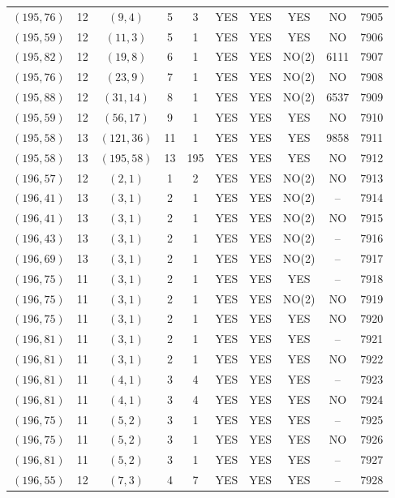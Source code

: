 \begin{longtable}{|c|c|c|c|c|c|c|c|c|c|}
$(195, 76)$ & 12 & $(9, 4)$ & 5 & 3 & YES & YES & YES & NO & 7905\\
$(195, 59)$ & 12 & $(11, 3)$ & 5 & 1 & YES & YES & YES & NO & 7906\\
$(195, 82)$ & 12 & $(19, 8)$ & 6 & 1 & YES & YES & NO(2) & 6111 & 7907\\
$(195, 76)$ & 12 & $(23, 9)$ & 7 & 1 & YES & YES & NO(2) & NO & 7908\\
$(195, 88)$ & 12 & $(31, 14)$ & 8 & 1 & YES & YES & NO(2) & 6537 & 7909\\
$(195, 59)$ & 12 & $(56, 17)$ & 9 & 1 & YES & YES & YES & NO & 7910\\
$(195, 58)$ & 13 & $(121, 36)$ & 11 & 1 & YES & YES & YES & 9858 & 7911\\
$(195, 58)$ & 13 & $(195, 58)$ & 13 & 195 & YES & YES & YES & NO & 7912\\
$(196, 57)$ & 12 & $(2, 1)$ & 1 & 2 & YES & YES & NO(2) & NO & 7913\\
$(196, 41)$ & 13 & $(3, 1)$ & 2 & 1 & YES & YES & NO(2) & -- & 7914\\
$(196, 41)$ & 13 & $(3, 1)$ & 2 & 1 & YES & YES & NO(2) & NO & 7915\\
$(196, 43)$ & 13 & $(3, 1)$ & 2 & 1 & YES & YES & NO(2) & -- & 7916\\
$(196, 69)$ & 13 & $(3, 1)$ & 2 & 1 & YES & YES & NO(2) & -- & 7917\\
$(196, 75)$ & 11 & $(3, 1)$ & 2 & 1 & YES & YES & YES & -- & 7918\\
$(196, 75)$ & 11 & $(3, 1)$ & 2 & 1 & YES & YES & NO(2) & NO & 7919\\
$(196, 75)$ & 11 & $(3, 1)$ & 2 & 1 & YES & YES & YES & NO & 7920\\
$(196, 81)$ & 11 & $(3, 1)$ & 2 & 1 & YES & YES & YES & -- & 7921\\
$(196, 81)$ & 11 & $(3, 1)$ & 2 & 1 & YES & YES & YES & NO & 7922\\
$(196, 81)$ & 11 & $(4, 1)$ & 3 & 4 & YES & YES & YES & -- & 7923\\
$(196, 81)$ & 11 & $(4, 1)$ & 3 & 4 & YES & YES & YES & NO & 7924\\
$(196, 75)$ & 11 & $(5, 2)$ & 3 & 1 & YES & YES & YES & -- & 7925\\
$(196, 75)$ & 11 & $(5, 2)$ & 3 & 1 & YES & YES & YES & NO & 7926\\
$(196, 81)$ & 11 & $(5, 2)$ & 3 & 1 & YES & YES & YES & -- & 7927\\
$(196, 55)$ & 12 & $(7, 3)$ & 4 & 7 & YES & YES & YES & -- & 7928\\

\end{longtable}
